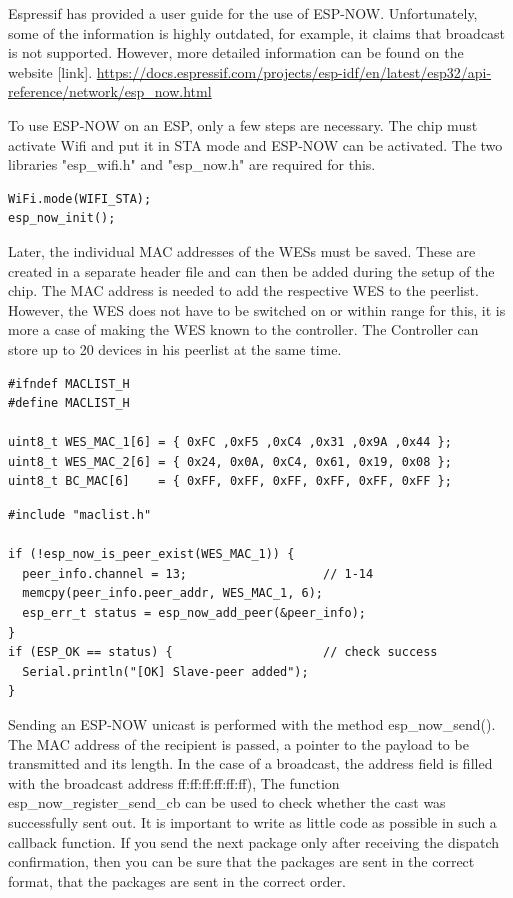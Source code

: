 Espressif has provided a user guide for the use of ESP-NOW.
Unfortunately, some of the information is highly outdated, for example, it claims that broadcast is not supported.
However, more detailed information can be found on the website [link].
\url{https://docs.espressif.com/projects/esp-idf/en/latest/esp32/api-reference/network/esp_now.html}

To use ESP-NOW on an ESP, only a few steps are necessary.
The chip must activate Wifi and put it in STA mode and ESP-NOW can be activated.
The two libraries "esp\_wifi.h" and "esp\_now.h" are required for this.

\begin{lstlisting}[caption=Init ESP-NOW]
WiFi.mode(WIFI_STA);
esp_now_init();
\end{lstlisting}
\label{lst:init}

Later, the individual MAC addresses of the WESs must be saved.
These are created in a separate header file and can then be added during the setup of the chip.
The MAC address is needed to add the respective WES to the peerlist.
However, the WES does not have to be switched on or within range for this, it is more a case of making the WES known to the controller.
The Controller can store up to 20 devices in his peerlist at the same time.

\begin{lstlisting}
#ifndef MACLIST_H
#define MACLIST_H

uint8_t WES_MAC_1[6] = { 0xFC ,0xF5 ,0xC4 ,0x31 ,0x9A ,0x44 };
uint8_t WES_MAC_2[6] = { 0x24, 0x0A, 0xC4, 0x61, 0x19, 0x08 };
uint8_t BC_MAC[6]    = { 0xFF, 0xFF, 0xFF, 0xFF, 0xFF, 0xFF };
\end{lstlisting}
\label{lst:macaddress}

\begin{lstlisting}[caption=Add Peers]
#include "maclist.h"

if (!esp_now_is_peer_exist(WES_MAC_1)) {
  peer_info.channel = 13;                   // 1-14
  memcpy(peer_info.peer_addr, WES_MAC_1, 6);
  esp_err_t status = esp_now_add_peer(&peer_info);
}
if (ESP_OK == status) {                     // check success
  Serial.println("[OK] Slave-peer added"); 
}
\end{lstlisting}

Sending an ESP-NOW unicast is performed with the method esp\_now\_send().
The MAC address of the recipient is passed, a pointer to the payload to be transmitted and its length.
In the case of a broadcast, the address field is filled with the broadcast address ff:ff:ff:ff:ff:ff),
The function esp\_now\_register\_send\_cb can be used to check whether the cast was successfully sent out.
It is important to write as little code as possible in such a callback function.
If you send the next package only after receiving the dispatch confirmation, then you can be sure that the packages are sent in the correct format,
that the packages are sent in the correct order.

